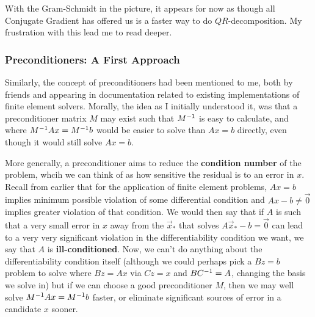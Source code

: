 \documentclass[11pt]{article}
\begin{document}

With the Gram-Schmidt in the picture, it appears for now as though all Conjugate Gradient has offered us is a faster way to do $QR$-decomposition. My frustration with this lead me to read deeper.

\subsubsection{Preconditioners: A First Approach}

Similarly, the concept of preconditioners had been mentioned to me, both by friends and appearing in documentation related to existing implementations of finite element solvers. Morally, the idea as I initially understood it, was that a preconditioner matrix $M$ may exist such that $M^{-1}$ is easy to calculate, and where $M^{-1} A x = M^{-1} b$ would be easier to solve than $Ax = b$ directly, even though it would still solve $Ax=b$.

More generally, a preconditioner aims to reduce the \textbf{condition number} of the problem, whcih we can think of as how sensitive the residual is to an error in $x$. Recall from earlier that for the application of finite element problems, $Ax=b$ implies minimum possible violation of some differential condition and $Ax - b \neq \vec 0$ implies greater violation of that condition. We would then say that if $A$ is such that a very small error in $x$ away from the $\vec x_*$ that solves $A\vec x_* - b = \vec 0 $ can lead to a very very significant violation in the differentiability condition we want, we say that $A$ is \textbf{ill-conditioned}. Now, we can't do anything about the differentiability condition itself (although we could perhaps pick a $Bz = b$ problem to solve where $Bz = Ax$ via $Cz = x$ and $BC^{-1} = A$, changing the basis we solve in) but if we can choose a good preconditioner $M$, then we may well solve $M^{-1} A x = M^{-1} b$ faster, or eliminate significant sources of error in a candidate $x$ sooner.
\end{document}
